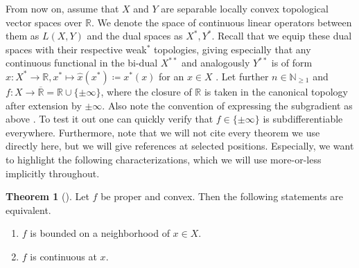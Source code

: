 \documentclass[10pt, leqno]{amsart}
\theoremstyle{definition}
\newtheorem{theorem}{Theorem}[section]
\theoremstyle{remark}
\begin{document}
    From now on, assume that \(X\) and \(Y\) are separable locally convex topological vector spaces over \(\mathbb{R}\). We denote the space of continuous linear operators between them as \(L(X, Y)\) and the dual spaces as \(X^*, Y^*\). Recall that we equip these dual spaces with their respective weak\({}^*\) topologies, giving especially that any continuous functional in the bi-dual \(X^{**}\) and analogously \(Y^{**}\) is of form \(\hat{x}\colon X^* \to \mathbb{R}, x^* \mapsto \hat{x}(x^*) \coloneqq x^*(x)\) for an \(x \in X\) \cite[pp. 439-440]{Werner}. Let further \(n \in \mathbb{N}_{\geq 1}\) and \(f\colon X \to \overline{\mathbb{R}} = \mathbb{R} \cup \{\pm \infty\}\), where the closure of \(\mathbb{R}\) is taken in the canonical topology after extension by \(\pm \infty\). Also note the convention of expressing the subgradient as above \cite[p. 214]{Rockafellar}. To test it out one can quickly verify that \(f \in \{\pm \infty\}\) is subdifferentiable everywhere. Furthermore, note that we will not cite every theorem we use directly here, but we will give references at selected positions. Especially, we want to highlight the following characterizations, which we will use more-or-less implicitly throughout.

    \begin{theorem}[{\cite[pp. 170-171]{IoffeTihomirov}}] \label{proper_convex_continuity_boundedness_equivalence}
        Let \(f\) be proper and convex. Then the following statements are equivalent.
        \begin{enumerate}[label=(\roman*), wide]
            \item \(f\) is bounded on a neighborhood of \(x \in X\).
            \item \(f\) is continuous at \(x\).
        \end{enumerate}
    \end{theorem}
\end{document}
